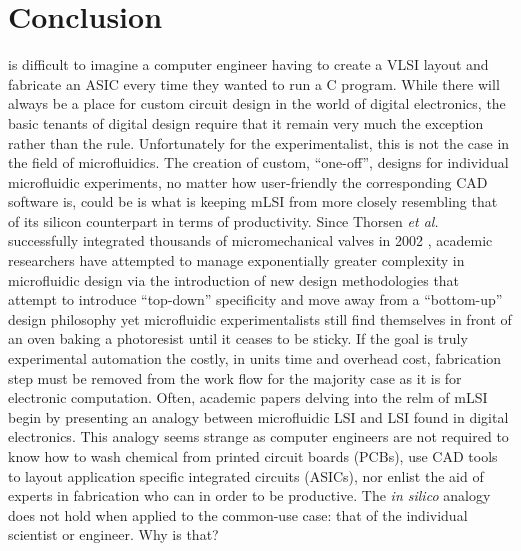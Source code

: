 \documentclass[11pt,journal,compsoc, onecolumn]{IEEEtran}
\begin{document}
\section{Conclusion}
 is
difficult to imagine a computer engineer having to create a VLSI layout and
fabricate an ASIC every time they wanted to run a C program. While there will
always be a place for custom circuit design in the world of digital
electronics, the basic tenants of digital design require that it remain
very much the exception rather than the rule. Unfortunately for the
experimentalist, this is not the case in the field of microfluidics. 
The creation of custom, ``one-off'', designs
for individual microfluidic experiments, no matter how user-friendly the
corresponding CAD software is, could be is what is keeping mLSI from
more closely resembling that of its silicon counterpart in terms of
productivity. Since Thorsen \emph{et al.} successfully integrated thousands of
micromechanical valves in 2002 \cite{thorsen2002}, academic researchers have
attempted to manage exponentially greater complexity in microfluidic design via
the introduction of new design methodologies that attempt to introduce
``top-down'' specificity and move away from a ``bottom-up'' design philosophy
 \cite{minhass2013}\cite{melin2007}\cite{minhass2012} yet microfluidic
 experimentalists still find themselves in front of an oven baking a photoresist
until it ceases to be sticky. If the goal is truly experimental automation the
costly, in units time and overhead cost, fabrication step must be removed from the
work flow for the majority case as it is for electronic computation. 
Often, academic papers delving into the relm of mLSI begin by presenting an analogy
between microfluidic LSI and LSI found in digital electronics. This analogy seems
strange as computer engineers are not required to know how to wash chemical
from printed circuit boards (PCBs), use CAD tools to layout application
specific integrated circuits (ASICs), nor enlist the aid of experts in
fabrication who can in order to be productive.  The \emph{in
silico} analogy does not hold when applied to the common-use case: that of the
individual scientist or
engineer. Why is that? 
\end{document}
